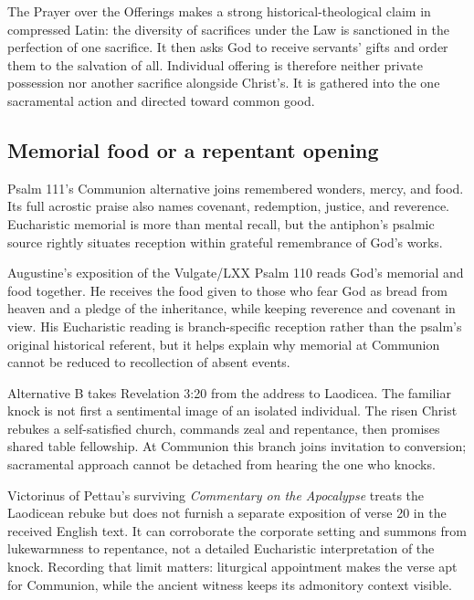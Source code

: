 \begin{deepstudy}
The Prayer over the Offerings makes a strong historical-theological claim in compressed Latin: the diversity of sacrifices under the Law is sanctioned in the perfection of one sacrifice. It then asks God to receive servants' gifts and order them to the salvation of all. Individual offering is therefore neither private possession nor another sacrifice alongside Christ's. It is gathered into the one sacramental action and directed toward common good.

\subsection*{Memorial food or a repentant opening\enspace{}}

Psalm 111's Communion alternative joins remembered wonders, mercy, and food. Its full acrostic praise also names covenant, redemption, justice, and reverence. Eucharistic memorial is more than mental recall, but the antiphon's psalmic source rightly situates reception within grateful remembrance of God's works.

Augustine's exposition of the Vulgate/LXX Psalm 110 reads God's memorial and food together. He receives the food given to those who fear God as bread from heaven and a pledge of the inheritance, while keeping reverence and covenant in view. His Eucharistic reading is branch-specific reception rather than the psalm's original historical referent, but it helps explain why memorial at Communion cannot be reduced to recollection of absent events.

Alternative B takes Revelation 3:20 from the address to Laodicea. The familiar knock is not first a sentimental image of an isolated individual. The risen Christ rebukes a self-satisfied church, commands zeal and repentance, then promises shared table fellowship. At Communion this branch joins invitation to conversion; sacramental approach cannot be detached from hearing the one who knocks.

Victorinus of Pettau's surviving \emph{Commentary on the Apocalypse} treats the Laodicean rebuke but does not furnish a separate exposition of verse 20 in the received English text. It can corroborate the corporate setting and summons from lukewarmness to repentance, not a detailed Eucharistic interpretation of the knock. Recording that limit matters: liturgical appointment makes the verse apt for Communion, while the ancient witness keeps its admonitory context visible.


\end{deepstudy}
